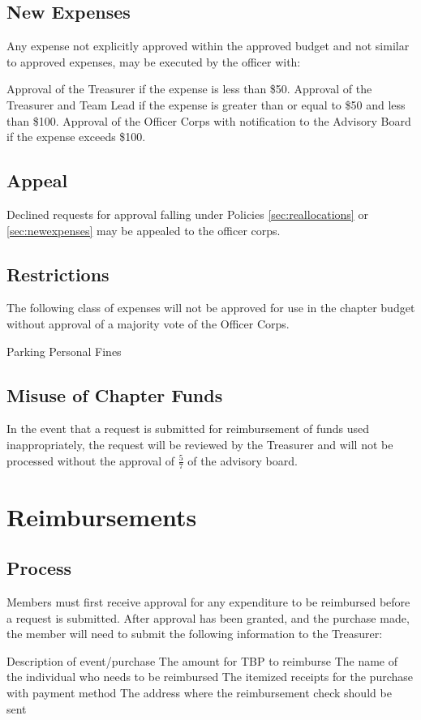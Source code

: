 \documentclass[bylaws,final,10pt,withoutoptional,withoutpreface,officerdoc]{../bylaws}
\begin{document}
\section{New Expenses} Any expense not explicitly approved within the approved budget and not similar to approved expenses, may be executed by the officer with:
 \begin{enumsubsection}\label{sec:newexpenses}
 	\itemnotoc Approval of the Treasurer if the expense is less than \$50.
 	\itemnotoc Approval of the Treasurer and Team Lead if the expense is greater than or equal to \$50 and less than \$100.
	\itemnotoc Approval of the Officer Corps with notification to the Advisory Board if the expense exceeds \$100.
\end{enumsubsection}

\section{Appeal} Declined requests for approval falling under Policies \ref{sec:reallocations} or \ref{sec:newexpenses} may be appealed to the officer corps. 

\section{Restrictions} The following class of expenses will not be approved for use in the chapter budget without approval of a majority vote of the Officer Corps.
\begin{enumsubsection}
\itemnotoc Parking
\itemnotoc Personal Fines
\end{enumsubsection}

\section{Misuse of Chapter Funds} In the event that a request is submitted for reimbursement of funds used inappropriately, the request will be reviewed by the Treasurer and will not be processed without the approval of $\frac{5}{7}$ of the advisory board. 

\chapter{Reimbursements}\label{sec:reimbursement}

\section{Process} Members must first receive approval for any expenditure to be reimbursed before a request is submitted. After approval has been granted, and the purchase made, the member will need to submit the following information to the Treasurer:
\begin{enumsubsection}
	\itemnotoc Description of event/purchase
	\itemnotoc The amount for TBP to reimburse
	\itemnotoc The name of the individual who needs to be reimbursed
	\itemnotoc The itemized receipts for the purchase with payment method
	\itemnotoc The address where the reimbursement check should be sent
\end{enumsubsection}
\end{document}
